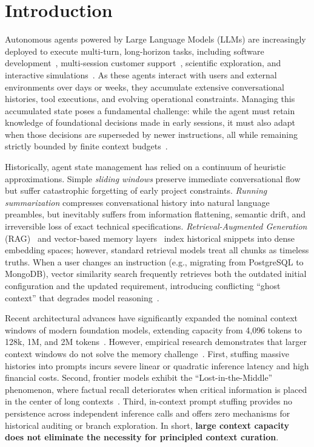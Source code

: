 \section{Introduction}
\label{sec:introduction}

Autonomous agents powered by Large Language Models (LLMs) are increasingly deployed to execute multi-turn, long-horizon tasks, including software development~\cite{wu2025gcc}, multi-session customer support~\cite{deshmukh2024mem0}, scientific exploration, and interactive simulations~\cite{park2023generative}. As these agents interact with users and external environments over days or weeks, they accumulate extensive conversational histories, tool executions, and evolving operational constraints. Managing this accumulated state poses a fundamental challenge: while the agent must retain knowledge of foundational decisions made in early sessions, it must also adapt when those decisions are superseded by newer instructions, all while remaining strictly bounded by finite context budgets~\cite{packer2023memgpt,liu2024lost}.

Historically, agent state management has relied on a continuum of heuristic approximations. Simple \textit{sliding windows} preserve immediate conversational flow but suffer catastrophic forgetting of early project constraints. \textit{Running summarization} compresses conversational history into natural language preambles, but inevitably suffers from information flattening, semantic drift, and irreversible loss of exact technical specifications. \textit{Retrieval-Augmented Generation} (RAG)~\cite{lewis2020retrieval,guu2020realm} and vector-based memory layers~\cite{deshmukh2024mem0} index historical snippets into dense embedding spaces; however, standard retrieval models treat all chunks as timeless truths. When a user changes an instruction (e.g., migrating from PostgreSQL to MongoDB), vector similarity search frequently retrieves both the outdated initial configuration and the updated requirement, introducing conflicting ``ghost context'' that degrades model reasoning~\cite{stale2025benchmark,wu2024longmemeval}.

Recent architectural advances have significantly expanded the nominal context windows of modern foundation models, extending capacity from 4,096 tokens to 128k, 1M, and 2M tokens~\cite{brown2020language,dong2023bamboo}. However, empirical research demonstrates that larger context windows do not solve the memory challenge~\cite{liu2024lost,maharana2024locomo}. First, stuffing massive histories into prompts incurs severe linear or quadratic inference latency and high financial costs. Second, frontier models exhibit the ``Lost-in-the-Middle'' phenomenon, where factual recall deteriorates when critical information is placed in the center of long contexts~\cite{liu2024lost}. Third, in-context prompt stuffing provides no persistence across independent inference calls and offers zero mechanisms for historical auditing or branch exploration. In short, \textbf{large context capacity does not eliminate the necessity for principled context curation}.

